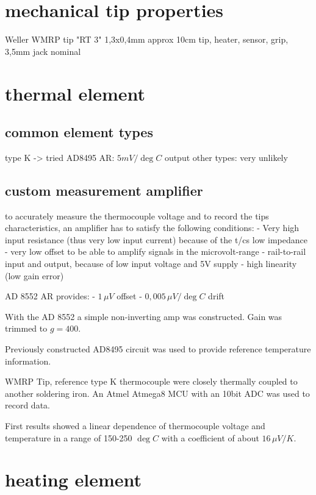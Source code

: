 \section{mechanical tip properties}
Weller WMRP tip "RT 3" 1,3x0,4mm
approx 10cm
tip, heater, sensor, grip, 3,5mm jack
nominal 


\section{thermal element}


\subsection{common element types}
type K -> tried AD8495 AR: $5mV/\deg C$ output
other types: very unlikely


\subsection{custom measurement amplifier}
to accurately measure the thermocouple voltage and to record the tips characteristics, an amplifier has to satisfy the following conditions:
- Very high input resistance (thus very low input current) because of the t/cs low impedance
- very low offset to be able to amplify signals in the microvolt-range
- rail-to-rail input and output, because of low input voltage and 5V supply
- high linearity (low gain error)

AD 8552 AR
provides:
 - $1\,\mu V$ offset
 - $0,005\,\mu V/\deg C$ drift


With the AD 8552 a simple non-inverting amp was constructed. Gain was trimmed to $g=400$.

Previously constructed AD8495 circuit was used to provide reference temperature information.

WMRP Tip, reference type K thermocouple were closely thermally coupled to another soldering iron. An Atmel Atmega8 MCU with an 10bit ADC was used to record data.

First results showed a linear dependence of thermocouple voltage and temperature in a range of 150-250 $\deg C$ with a coefficient of about $16\,\mu V/K$.


\section{heating element}
